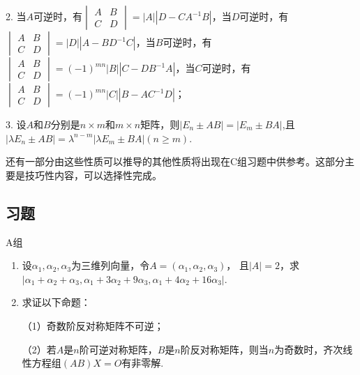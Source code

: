 2. 当$A$可逆时，有$\begin{vmatrix}
	A & B \\ C & D
\end{vmatrix} = |A||D-CA^{-1}B|$，当$D$可逆时，有
$\begin{vmatrix}
	A & B \\ C & D
\end{vmatrix} = |D||A-BD^{-1}C|$，当$B$可逆时，有
$\begin{vmatrix}
	A & B \\ C & D
\end{vmatrix} = (-1)^{mn}|B||C-DB^{-1}A|$，当$C$可逆时，有
$\begin{vmatrix}
	A & B \\ C & D
\end{vmatrix} = (-1)^{mn}|C||B-AC^{-1}D|$；

3. 设$A$和$B$分别是$n \times m$和$m \times n$矩阵，则$|E_n \pm AB|=|E_m \pm BA|$,且
$|\lambda E_n \pm AB|=\lambda^{n-m}|\lambda E_m \pm BA|(n \ge m)$.

还有一部分由这些性质可以推导的其他性质将出现在C组习题中供参考。这部分主要是技巧性内容，可以选择性完成。
\subsection{习题}
\centerline{\heiti A组}
\begin{enumerate}
	\item 设$\alpha_1,\alpha_2,\alpha_3$为三维列向量，令$A=(\alpha_1,\alpha_2,\alpha_3)$，
	且$|A|=2$，求$|\alpha_1+\alpha_2+\alpha_3,\alpha_1+3\alpha_2+9\alpha_3,\alpha_1+4\alpha_2+16\alpha_3|$.
	\item 求证以下命题：
	
	（1）奇数阶反对称矩阵不可逆；
	
	（2）若$A$是$n$阶可逆对称矩阵，$B$是$n$阶反对称矩阵，则当$n$为奇数时，齐次线性方程组$(AB)X=O$有非零解.
\end{enumerate}

